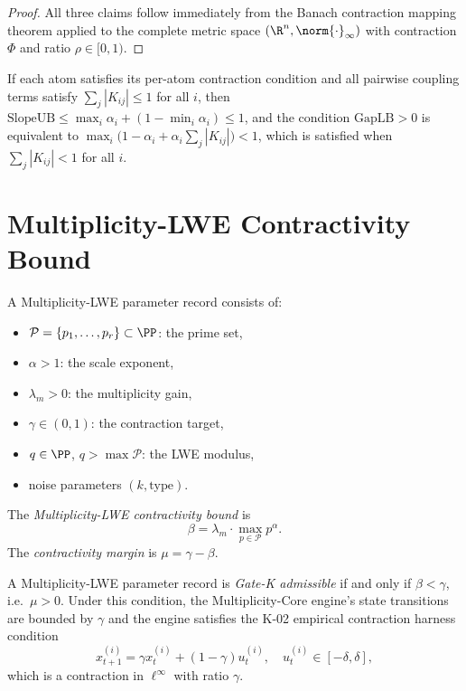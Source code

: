 \documentclass[11pt]{article}
\begin{document}
\begin{proof}
All three claims follow immediately from the Banach contraction mapping
theorem applied to the complete metric space $(\R^n,\norm{\cdot}_\infty)$
with contraction $\Phi$ and ratio $\rho\in[0,1)$.
\end{proof}

\begin{corollary}
If each atom satisfies its per-atom contraction condition and all pairwise
coupling terms satisfy $\sum_j |K_{ij}|\leq 1$ for all $i$, then
$\mathrm{SlopeUB} \leq \max_i\alpha_i + (1-\min_i\alpha_i)\leq 1$, and
the condition $\mathrm{GapLB}>0$ is equivalent to
$\max_i\bigl(1-\alpha_i + \alpha_i \textstyle\sum_j|K_{ij}|\bigr) < 1$,
which is satisfied when $\sum_j|K_{ij}|<1$ for all $i$.
\end{corollary}

\section{Multiplicity-LWE Contractivity Bound}

\begin{definition}
A Multiplicity-LWE parameter record consists of:
\begin{itemize}[leftmargin=2em]
  \item $\mathcal{P} = \{p_1,\dots,p_r\}\subset\PP$: the prime set,
  \item $\alpha > 1$: the scale exponent,
  \item $\lambda_m > 0$: the multiplicity gain,
  \item $\gamma\in(0,1)$: the contraction target,
  \item $q\in\PP$, $q > \max\mathcal{P}$: the LWE modulus,
  \item noise parameters $(k, \mathrm{type})$.
\end{itemize}
\end{definition}

\begin{definition}
The \emph{Multiplicity-LWE contractivity bound} is
\[
  \beta = \lambda_m \cdot \max_{p\in\mathcal{P}} p^\alpha.
\]
The \emph{contractivity margin} is $\mu = \gamma - \beta$.
\end{definition}

\begin{theorem}
\label{thm:gatek}
A Multiplicity-LWE parameter record is \emph{Gate-K admissible} if and only
if $\beta < \gamma$, i.e.\ $\mu > 0$.  Under this condition, the
Multiplicity-Core engine's state transitions are bounded by $\gamma$ and the
engine satisfies the K-02 empirical contraction harness condition
\[
  x_{t+1}^{(i)} = \gamma x_t^{(i)} + (1-\gamma) u_t^{(i)},
  \quad u_t^{(i)}\in[-\delta,\delta],
\]
which is a contraction in $\ell^\infty$ with ratio $\gamma$.
\end{theorem}
\end{document}
